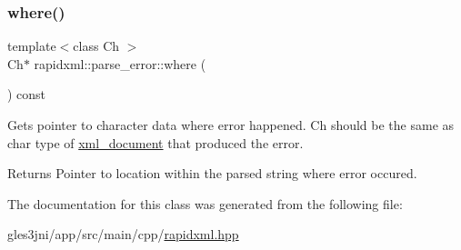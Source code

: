 \subsubsection{\texorpdfstring{where()}{where()}}
{\footnotesize\ttfamily template$<$class Ch $>$ \\
Ch$\ast$ rapidxml\+::parse\+\_\+error\+::where (\begin{DoxyParamCaption}{ }\end{DoxyParamCaption}) const\hspace{0.3cm}{\ttfamily [inline]}}

Gets pointer to character data where error happened. Ch should be the same as char type of \hyperlink{classrapidxml_1_1xml__document}{xml\+\_\+document} that produced the error. \begin{DoxyReturn}{Returns}
Pointer to location within the parsed string where error occured. 
\end{DoxyReturn}


The documentation for this class was generated from the following file\+:\begin{DoxyCompactItemize}
\item 
gles3jni/app/src/main/cpp/\hyperlink{rapidxml_8hpp}{rapidxml.\+hpp}\end{DoxyCompactItemize}
